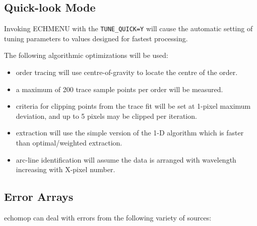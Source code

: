 \documentclass[11pt,twoside]{article}
\makeatletter
\newcommand{\htmlref}[2]{#1}
\newcommand{\xlabel}[1]{}
\newcommand{\mlabel}[1]{\xlabel{#1}\label{#1}}
\newcommand{\myindex}[1]{\index{#1}}
\newcommand{\indexcmdname}[1]{\index{#1@\protect\cmdname{#1}}}
\renewcommand{\myindex}[1]{}
\renewcommand{\indexcmdname}[1]{}
\newcommand{\cmdname}{\begingroup \catcode`\_=12 \realcmdname}
\newcommand{\realcmdname}[1]{\endgroup\texttt{#1}}
\makeatother
\begin{document}
\subsection{\mlabel{quick_look_mode}Quick-look Mode}
\myindex{Quick-look mode}

Invoking ECHMENU with the \htmlref{{\tt TUNE\_QUICK=Y}}{par_TUNE_QUICK}
will cause the automatic setting of tuning parameters to values designed for
fastest processing.

The following algorithmic optimizations will be used:
\indexcmdname{TUNE_QUICK}

\begin{itemize}

\item order tracing will use centre-of-gravity to locate the centre
      of the order.

\item a maximum of 200 trace sample points per order will be measured.

\item criteria for clipping points from the trace fit will be set
      at 1-pixel maximum deviation, and up to 5 pixels may be clipped
      per iteration.

\item extraction will use the simple version of the 1-D algorithm
      which is faster than optimal/weighted extraction.

\item arc-line identification will assume the data is arranged
      with wavelength increasing with X-pixel number.

\end{itemize}


\subsection{\mlabel{error_arrays}Error Arrays}
\myindex{Errors!arrays}
\myindex{Variance}

{\sc echomop} can deal with errors from the following variety of sources:

\myindex{Flat field!errors}
\end{document}
